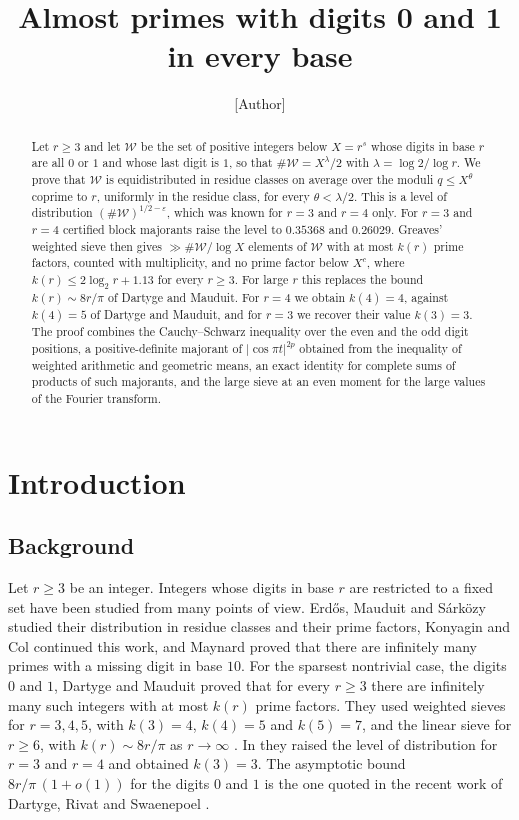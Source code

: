 \documentclass[11pt]{amsart}
\title{Almost primes with digits 0 and 1 in every base}
\author{[Author]}
\date{}
\theoremstyle{definition}
\numberwithin{equation}{section}
\newcommand{\WW}{\mathcal{W}}
\begin{document}
\begin{abstract}
Let $r\ge3$ and let $\WW$ be the set of positive integers below $X=r^s$ whose digits in base $r$ are all $0$ or $1$ and whose last digit is $1$, so that $\#\WW=X^{\lambda}/2$ with $\lambda=\log2/\log r$. We prove that $\WW$ is equidistributed in residue classes on average over the moduli $q\le X^{\theta}$ coprime to $r$, uniformly in the residue class, for every $\theta<\lambda/2$. This is a level of distribution $(\#\WW)^{1/2-\varepsilon}$, which was known for $r=3$ and $r=4$ only. For $r=3$ and $r=4$ certified block majorants raise the level to $0.35368$ and $0.26029$. Greaves' weighted sieve then gives $\gg\#\WW/\log X$ elements of $\WW$ with at most $k(r)$ prime factors, counted with multiplicity, and no prime factor below $X^{c}$, where $k(r)\le2\log_2r+1.13$ for every $r\ge3$. For large $r$ this replaces the bound $k(r)\sim8r/\pi$ of Dartyge and Mauduit. For $r=4$ we obtain $k(4)=4$, against $k(4)=5$ of Dartyge and Mauduit, and for $r=3$ we recover their value $k(3)=3$. The proof combines the Cauchy--Schwarz inequality over the even and the odd digit positions, a positive-definite majorant of $\lvert\cos\pi t\rvert^{2p}$ obtained from the inequality of weighted arithmetic and geometric means, an exact identity for complete sums of products of such majorants, and the large sieve at an even moment for the large values of the Fourier transform.
\end{abstract}

\maketitle

\section{Introduction}\label{sec:intro}

\subsection{Background}

Let $r\ge3$ be an integer. Integers whose digits in base $r$ are restricted to a fixed set have been studied from many points of view. Erd\H{o}s, Mauduit and S\'ark\"ozy \cite{EMS98,EMS99} studied their distribution in residue classes and their prime factors, Konyagin \cite{Ko01} and Col \cite{Col09} continued this work, and Maynard \cite{May19} proved that there are infinitely many primes with a missing digit in base $10$. For the sparsest nontrivial case, the digits $0$ and $1$, Dartyge and Mauduit \cite{DM00} proved that for every $r\ge3$ there are infinitely many such integers with at most $k(r)$ prime factors. They used weighted sieves for $r=3,4,5$, with $k(3)=4$, $k(4)=5$ and $k(5)=7$, and the linear sieve for $r\ge6$, with $k(r)\sim8r/\pi$ as $r\to\infty$ \cite[Thm.~5]{DM00}. In \cite[Thm.~3]{DM01} they raised the level of distribution for $r=3$ and $r=4$ and obtained $k(3)=3$. The asymptotic bound $8r/\pi\,(1+o(1))$ for the digits $0$ and $1$ is the one quoted in the recent work of Dartyge, Rivat and Swaenepoel \cite{DRS}.
\end{document}
